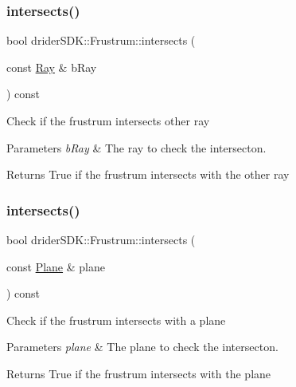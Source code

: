 \subsubsection{\texorpdfstring{intersects()}{intersects()}\hspace{0.1cm}{\footnotesize\ttfamily [1/5]}}
{\footnotesize\ttfamily bool drider\+S\+D\+K\+::\+Frustrum\+::intersects (\begin{DoxyParamCaption}\item[{const \hyperlink{classdrider_s_d_k_1_1_ray}{Ray} \&}]{b\+Ray }\end{DoxyParamCaption}) const}

Check if the frustrum intersects other ray


\begin{DoxyParams}{Parameters}
{\em b\+Ray} & The ray to check the intersecton.\\
\hline
\end{DoxyParams}
\begin{DoxyReturn}{Returns}
True if the frustrum intersects with the other ray 
\end{DoxyReturn}
\mbox{\label{classdrider_s_d_k_1_1_frustrum_ae816e17c5b6d6829a92e73d79305b224}} 
\subsubsection{\texorpdfstring{intersects()}{intersects()}\hspace{0.1cm}{\footnotesize\ttfamily [2/5]}}
{\footnotesize\ttfamily bool drider\+S\+D\+K\+::\+Frustrum\+::intersects (\begin{DoxyParamCaption}\item[{const \hyperlink{classdrider_s_d_k_1_1_plane}{Plane} \&}]{plane }\end{DoxyParamCaption}) const}

Check if the frustrum intersects with a plane


\begin{DoxyParams}{Parameters}
{\em plane} & The plane to check the intersecton.\\
\hline
\end{DoxyParams}
\begin{DoxyReturn}{Returns}
True if the frustrum intersects with the plane 
\end{DoxyReturn}
\mbox{\label{classdrider_s_d_k_1_1_frustrum_ab55226117775a0a5a9dd7f6a43faf2c0}} 
